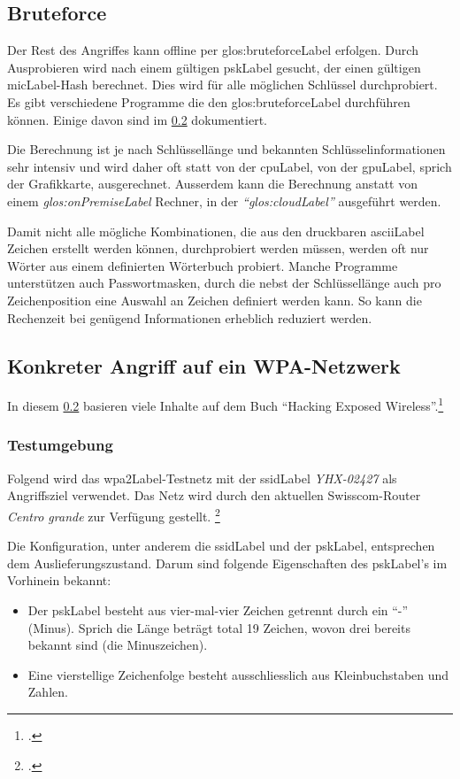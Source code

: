 \subsection{Bruteforce}
Der Rest des Angriffes kann offline per \gls{glos:bruteforceLabel} erfolgen. Durch Ausprobieren wird nach einem gültigen \gls{pskLabel} gesucht, der einen gültigen \gls{micLabel}-Hash berechnet. Dies wird für alle möglichen Schlüssel durchprobiert.
Es gibt verschiedene Programme die den \gls{glos:bruteforceLabel} durchführen können.
Einige davon sind im \cref{subsec:wpa_attack_tutorial} dokumentiert.

Die Berechnung ist je nach Schlüssellänge und bekannten Schlüsselinformationen sehr intensiv und wird daher oft statt von der \gls{cpuLabel}, von der \gls{gpuLabel}, sprich der Grafikkarte, ausgerechnet.
Ausserdem kann die Berechnung anstatt von einem \textit{\gls{glos:onPremiseLabel}} Rechner, in der \textit{"`\gls{glos:cloudLabel}"'} ausgeführt werden.

Damit nicht alle mögliche Kombinationen, die aus den druckbaren \gls{asciiLabel} Zeichen erstellt werden können, durchprobiert werden müssen, werden oft nur Wörter aus einem definierten Wörterbuch probiert.
Manche Programme unterstützen auch Passwortmasken, durch die nebst der Schlüssellänge auch pro Zeichenposition eine Auswahl an Zeichen definiert werden kann. So kann die Rechenzeit bei genügend Informationen erheblich reduziert werden.


\subsection{Konkreter Angriff auf ein WPA-Netzwerk}
\label{subsec:wpa_attack_tutorial}

In diesem \cref{subsec:wpa_attack_tutorial} basieren viele Inhalte auf dem Buch "`Hacking Exposed Wireless"'.\footcite[][148f.]{WrightCache201503}

\subsubsection{Testumgebung}
\label{subsubsec:wpa_test_environment}

Folgend wird das \gls{wpa2Label}-Testnetz mit der \gls{ssidLabel} \textit{YHX-02427} als Angriffsziel verwendet.
Das Netz wird durch den aktuellen Swisscom-Router \textit{Centro grande} zur Verfügung gestellt. \footcite{Centro_grande_Analog_Standard_-_WLAN_Router_Swisscom_2015-04-15}

Die Konfiguration, unter anderem die \gls{ssidLabel} und der \gls{pskLabel}, entsprechen dem Auslieferungszustand.
Darum sind folgende Eigenschaften des \gls{pskLabel}'s im Vorhinein bekannt:
\begin{itemize}
	\item Der \gls{pskLabel} besteht aus vier-mal-vier Zeichen getrennt durch ein "`-"' (Minus). Sprich die Länge beträgt total 19 Zeichen, wovon drei bereits bekannt sind (die Minuszeichen).
	\item Eine vierstellige Zeichenfolge besteht ausschliesslich aus Kleinbuchstaben und Zahlen.
\end{itemize}

